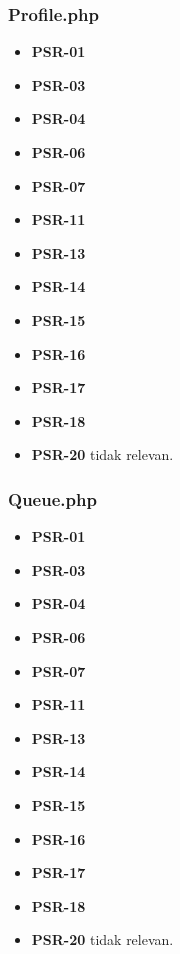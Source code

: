 \subsubsection{Profile.php}
\begin{itemize}
	\item \textbf{PSR-01} 
	\item \textbf{PSR-03}
	\item \textbf{PSR-04}
	\item \textbf{PSR-06}
	\item \textbf{PSR-07}
	\item \textbf{PSR-11}
	\item \textbf{PSR-13}
	\item \textbf{PSR-14}
	\item \textbf{PSR-15}
	\item \textbf{PSR-16}
	\item \textbf{PSR-17} 
	\item \textbf{PSR-18} 
	\item \textbf{PSR-20} tidak relevan.
\end{itemize}

\subsubsection{Queue.php}
\begin{itemize}
	\item \textbf{PSR-01} 
	\item \textbf{PSR-03}
	\item \textbf{PSR-04}
	\item \textbf{PSR-06}
	\item \textbf{PSR-07}
	\item \textbf{PSR-11}
	\item \textbf{PSR-13}
	\item \textbf{PSR-14}
	\item \textbf{PSR-15}
	\item \textbf{PSR-16}
	\item \textbf{PSR-17} 
	\item \textbf{PSR-18} 
	\item \textbf{PSR-20} tidak relevan.
\end{itemize}

